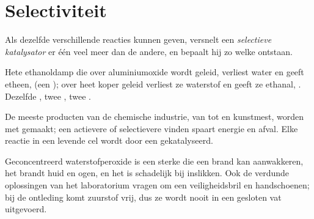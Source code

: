 \section{Selectiviteit}

\begin{definition}\label{def:g12:catalysis:selective}
Als dezelfde  verschillende reacties kunnen geven, versnelt
een \emph{selectieve katalysator} er één
veel meer dan de andere, en bepaalt hij zo welke 
ontstaan.
\end{definition}

\begin{example}\label{ex:g12:catalysis:ethanol}
Hete ethanoldamp die over aluminiumoxide wordt geleid, verliest water en
geeft etheen,  (een ); over heet koper
geleid verliest ze waterstof en geeft ze ethanal,
. Dezelfde , twee , twee
.
\end{example}

\begin{remark}\label{rem:g12:catalysis:everywhere}
De meeste producten van de chemische industrie, van  tot
 en kunstmest, worden met  gemaakt; een
actievere of selectievere  vinden spaart energie en afval.
Elke reactie in een levende cel wordt door een  gekatalyseerd.
\end{remark}

\begin{safety}{}
Geconcentreerd waterstofperoxide is een sterke  die een brand kan
aanwakkeren, het brandt huid en ogen, en het is schadelijk bij inslikken.
Ook de verdunde oplossingen van het laboratorium vragen om een
veiligheidsbril en handschoenen; bij de ontleding komt zuurstof vrij, dus
ze wordt nooit in een gesloten vat uitgevoerd.
\end{safety}

